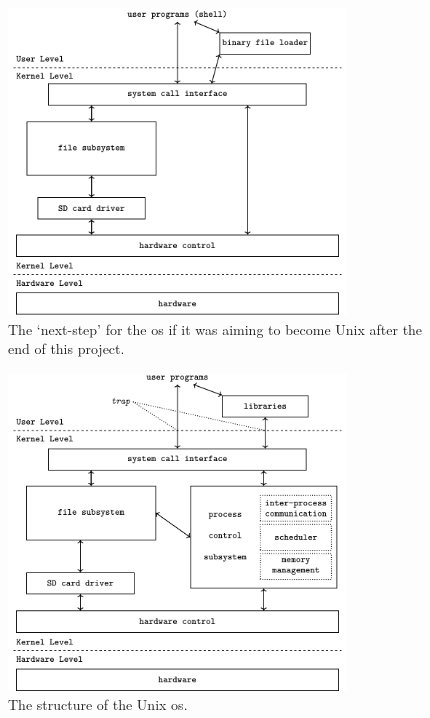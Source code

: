 \documentclass{article}
\begin{document}
\begin{figure}[H]
    \centering
    \includegraphics[width=0.8\textwidth]{build/nextstep-block-diagram.pdf}
    \caption{The `next-step' for the \gls{os} if it was aiming to become Unix
    after the end of this project.}
    \label{fig:appendix_nextstep_block_diagram}
\end{figure}

\begin{figure}[H]
    \centering
    \includegraphics[width=0.8\textwidth]{build/os-block-diagram.pdf}
    \caption{The structure of the Unix \gls{os}.}
    \label{fig:appendix_os_block_diagram}
\end{figure}

\clearpage
\printglossaries
\end{document}
